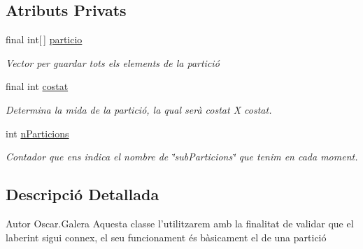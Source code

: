 \subsection*{Atributs Privats}
\begin{DoxyCompactItemize}
\item 
\hypertarget{classlogica_1_1_validador_laberint_1_1_particio_a77542aa20574c416574f87ca688fd3f4}{final int\mbox{[}$\,$\mbox{]} \hyperlink{classlogica_1_1_validador_laberint_1_1_particio_a77542aa20574c416574f87ca688fd3f4}{particio}}\label{classlogica_1_1_validador_laberint_1_1_particio_a77542aa20574c416574f87ca688fd3f4}

\begin{DoxyCompactList}\small\item\em Vector per guardar tots els elements de la partició \end{DoxyCompactList}\item 
\hypertarget{classlogica_1_1_validador_laberint_1_1_particio_aea17b1b87c85801a9ee677412b702e83}{final int \hyperlink{classlogica_1_1_validador_laberint_1_1_particio_aea17b1b87c85801a9ee677412b702e83}{costat}}\label{classlogica_1_1_validador_laberint_1_1_particio_aea17b1b87c85801a9ee677412b702e83}

\begin{DoxyCompactList}\small\item\em Determina la mida de la partició, la qual serà costat X costat. \end{DoxyCompactList}\item 
\hypertarget{classlogica_1_1_validador_laberint_1_1_particio_a89a4308fa4580773cf760520740aa6ef}{int \hyperlink{classlogica_1_1_validador_laberint_1_1_particio_a89a4308fa4580773cf760520740aa6ef}{n\+Particions}}\label{classlogica_1_1_validador_laberint_1_1_particio_a89a4308fa4580773cf760520740aa6ef}

\begin{DoxyCompactList}\small\item\em Contador que ens indica el nombre de \char`\"{}sub\+Particions\char`\"{} que tenim en cada moment. \end{DoxyCompactList}\end{DoxyCompactItemize}


\subsection{Descripció Detallada}
\begin{DoxyAuthor}{Autor}
Oscar.\+Galera  Aquesta classe l'utilitzarem amb la finalitat de validar que el laberint sigui connex, el seu funcionament és bàsicament el de una partició 
\end{DoxyAuthor}


